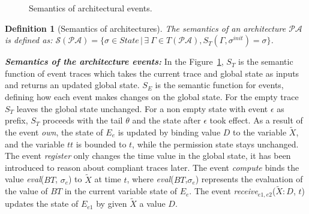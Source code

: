 \documentclass[a4paper]{article}
\newtheorem{ttd}{Definition}
\begin{document}
\begin{figure}[htbp]
{\begin{minipage}{11.87 cm}
\end{minipage}
}
\caption{Semantics of architectural events.}\label{fig:semevent}
\end{figure}

\begin{ttd}[Semantics of architectures]
The semantics of an architecture $\mathcal{P}\mathcal{A}$ is defined as:
$\mathcal{S}(\mathcal{P}\mathcal{A}) = \{\sigma \in \textit{State} \, | \, \exists\ \Gamma \in T(\mathcal{P}\mathcal{A}), S_T(\Gamma, \sigma^{init}) = \sigma \}$.
\end{ttd}

\textit{\textbf{Semantics of the architecture events:}} In the Figure~\ref{fig:semevent}, $S_T$ is the semantic function of event traces which takes the current trace and global state as inputs and returns an updated global state. $S_E$ is the semantic function for events, defining how each event makes changes on the global state. For the empty trace $S_T$ leaves the global state unchanged. For a non empty state with event $\epsilon$ as prefix, $S_T$ proceeds with the tail $\theta$ and the state after $\epsilon$ took effect. As a result of the event \textit{own}, the state of $E_e$ is updated by binding value $D$ to the variable $\tilde{X}$, and the variable $tt$ is bounded to $t$, while the permission state stays unchanged. The event \textit{register} only changes the time value in the global state, it has been introduced to reason about compliant traces later. The event \textit{compute} binds the value \textit{eval}($BT$, $\sigma_e$) to $\tilde{X}$ at time $t$, where \textit{eval}($BT$,$\sigma_e$) represents the evaluation of the value of $BT$ in the current variable state of $E_e$. The event \textit{receive}$_{e1,e2}$($\tilde{X}$$:$$D$, $t$) updates the state of $E_{e1}$ by given $\tilde{X}$ a value $D$. 
\end{document}
